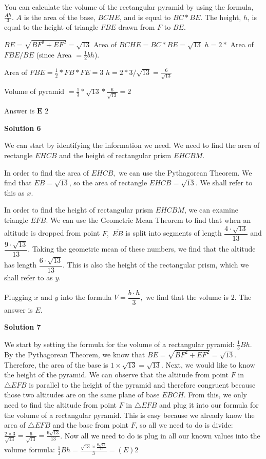 \begin{enumerate}
You can calculate the volume of the rectangular pyramid by using the formula, $\frac{Ah}{3}$. $A$ is the area of the base, $BCHE$, and is equal to $BC * BE$. The height, $h$, is equal to the height of triangle $FBE$ drawn from $F$ to $BE$.

 $BE=\sqrt{BF^2 + EF^2}=\sqrt{13}$ Area of $BCHE = BC * BE = \sqrt{13}$
$h = 2 *$ Area of $FBE / BE$ (since Area $= \frac{1}{2}bh$).

 Area of $FBE = \frac{1}{2} * FB * FE = 3$
$h = 2 * 3 / \sqrt{13} = \frac{6}{\sqrt{13}}$

 Volume of pyramid $=\frac{1}{3} * \sqrt{13} * \frac{6}{\sqrt{13}} = 2$

 Answer is $\boxed{\textbf{E } 2}$




\textbf{Solution 6}

We can start by identifying the information we need. We need to find the area of rectangle $EHCB$ and the height of rectangular prism $EHCBM$.

 In order to find the area of $EHCB,$ we can use the Pythagorean Theorem. We find that $EB = \sqrt{13}$, so the area of rectangle $EHCB = \sqrt{13}$. We shall refer to this as $x$.

 In order to find the height of rectangular prism $EHCBM$, we can examine triangle $EFB$. We can use the Geometric Mean Theorem to find that when an altitude is dropped from point $F,$ $\overline{EB}$ is split into segments of length $\dfrac{4 \cdot \sqrt{13}}{13}$ and $\dfrac{9 \cdot \sqrt{13}}{13}$. Taking the geometric mean of these numbers, we find that the altitude has length $\dfrac{6 \cdot \sqrt{13}}{13}$. This is also the height of the rectangular prism, which we shall refer to as $y$.

 Plugging $x$ and $y$ into the formula $V = \dfrac{b \cdot h}{3},$ we find that the volume is $\boxed{2}$. The answer is $\boxed{E}$.

 



\textbf{Solution 7}

We start by setting the formula for the volume of a rectangular pyramid: $\frac{1}{3}Bh$. By the Pythagorean Theorem, we know that $BE = \sqrt{BF^2 + EF^2} = \sqrt{13}$. Therefore, the area of the base is $1 \times \sqrt{13} = \sqrt{13}$. Next, we would like to know the height of the pyramid. We can observe that the altitude from point $F$ in $\triangle EFB$ is parallel to the height of the pyramid and therefore congruent because those two altitudes are on the same plane of base $EBCH$. From this, we only need to find the altitude from point $F$ in $\triangle EFB$ and plug it into our formula for the volume of a rectangular pyramid. This is easy because we already know the area of $\triangle EFB$ and the base from point $F$, so all we need to do is divide: $\frac{2 \times 3}{\sqrt{13}} = \frac{6}{\sqrt{13}} = \frac{6\sqrt{13}}{13}$. Now all we need to do is plug in all our known values into the volume formula: $\frac{1}{3}Bh = \frac{\sqrt{13} \times \frac{6\sqrt{13}}{13}}{3} = \boxed{(E) 2}$





\end{enumerate}
